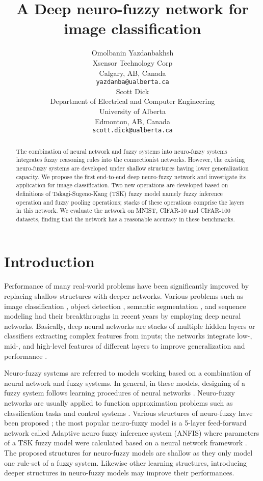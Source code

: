 \documentclass{article}
\title{A Deep neuro-fuzzy network for image classification}
\author{
Omolbanin Yazdanbakhsh 
  \\
  Xsensor Technology Corp\\
  Calgary, AB, Canada \\
  \texttt{yazdanba@ualberta.ca} \\
 \And
 Scott Dick \\
 Department of Electrical and Computer Engineering \\
 University of Alberta \\
 Edmonton, AB, Canada \\
 \texttt{scott.dick@ualberta.ca} \\
 }
\begin{document}
\maketitle

\begin{abstract}
 The combination of neural network and fuzzy systems into neuro-fuzzy systems integrates fuzzy reasoning rules into the connectionist networks. However, the existing neuro-fuzzy systems are developed under shallow structures having lower generalization capacity.  We propose the first end-to-end deep neuro-fuzzy network and investigate its application for image classification. Two new operations are developed based on definitions of Takagi-Sugeno-Kang (TSK) fuzzy model namely fuzzy inference operation and fuzzy pooling operations; stacks of these operations comprise the layers in this network. We evaluate the network on MNIST, CIFAR-10 and CIFAR-100 datasets, finding that the network has a reasonable accuracy in these benchmarks.
 \end{abstract}

\section{Introduction}

Performance of many real-world problems have been significantly improved by replacing shallow structures with deeper networks. Various problems such as image classification \citep{krizhevsky2012imagenet}, object detection \citep{ren2015faster}, semantic segmentation \citep{noh2015learning}, and sequence modeling \citep{gehring2017convolutional} had their breakthroughs in recent years by employing deep neural networks. Basically, deep neural networks are stacks of multiple hidden layers or classifiers extracting complex features from inputs; the networks integrate low-, mid-, and high-level features of different layers to improve generalization and performance \citep{bengio2009learning}. 

Neuro-fuzzy systems are referred to models working based on a combination of neural network and fuzzy systems. In general, in these models, designing of a fuzzy system follows learning procedures of neural networks \citep{nauck2013neuro}. Neuro-fuzzy networks are usually applied to function approximation problems such as classification tasks and control systems \citep{pedrycz1998neurofuzzy}. Various structures of neuro-fuzzy have been proposed \citep{nauck2013neuro}; the most popular neuro-fuzzy model is a 5-layer feed-forward network called Adaptive neuro fuzzy inference system (ANFIS) where parameters of a TSK fuzzy model were calculated based on a neural network framework \citep{jang1993anfis}. The proposed structures for neuro-fuzzy models are shallow as they only model one rule-set of a fuzzy system. Likewise other learning structures, introducing deeper structures in neuro-fuzzy models may improve their performances.
\end{document}

